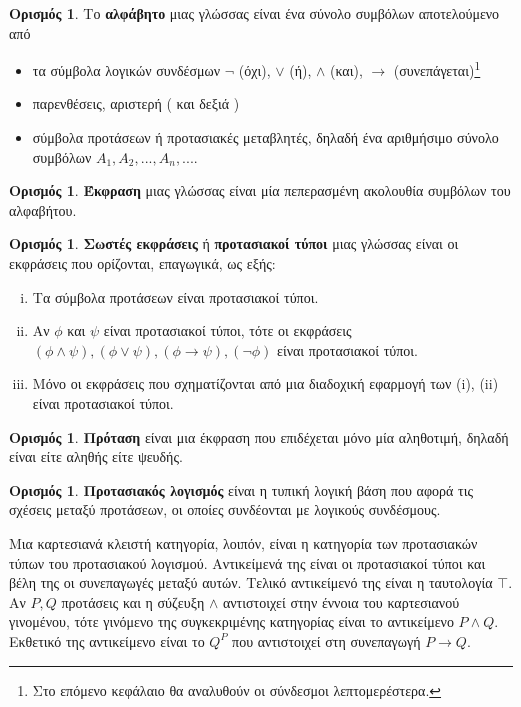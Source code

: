 \documentclass [a4paper,11pt] {book}
\theoremstyle{definition}
\theoremstyle{definition}
\newtheorem{definition}[theorem]{Ορισμός}
\begin{document}
\begin{definition}\label{alphabet}
Το \textbf{αλφάβητο} μιας γλώσσας είναι ένα σύνολο συμβόλων αποτελούμενο από
\begin{itemize}
\item τα σύμβολα λογικών συνδέσμων $ \neg$ (όχι), $\vee$ (ή), $\wedge$ (και), $\rightarrow$ (συνεπάγεται)\footnote{Στο επόμενο κεφάλαιο θα αναλυθούν οι σύνδεσμοι λεπτομερέστερα.}
\item παρενθέσεις, αριστερή ( και δεξιά )
\item σύμβολα προτάσεων ή προτασιακές μεταβλητές, δηλαδή ένα αριθμήσιμο σύνολο συμβόλων $A_{1},A_{2},...,A_{n},...$.
\end{itemize}
\end{definition}
\begin{definition}
\textbf{Έκφραση} μιας γλώσσας είναι μία πεπερασμένη ακολουθία συμβόλων του αλφαβήτου.
\end{definition}
\begin{definition}\label{well-formedFormulas}
\textbf{Σωστές εκφράσεις} ή \textbf{προτασιακοί τύποι} μιας γλώσσας είναι οι εκφράσεις που ορίζονται, επαγωγικά, ως εξής:
\begin{enumerate}[(i)]
\item Τα σύμβολα προτάσεων είναι προτασιακοί τύποι.
\item Αν $\phi$ και $\psi$ είναι προτασιακοί τύποι, τότε οι εκφράσεις $(\phi\wedge \psi), (\phi \vee \psi),(\phi \to \psi), (\neg \phi)$ είναι προτασιακοί τύποι.
\item Μόνο οι εκφράσεις που σχηματίζονται από μια διαδοχική εφαρμογή των (i), (ii) είναι προτασιακοί τύποι.
\end{enumerate}
\begin{definition}\label{proposition}
\textbf{Πρόταση} είναι μια έκφραση που επιδέχεται μόνο μία αληθοτιμή, δηλαδή είναι είτε αληθής είτε ψευδής.
\end{definition}
\begin{definition}\label{propositionalCalculus}
\textbf{Προτασιακός λογισμός} είναι η τυπική λογική βάση που αφορά τις σχέσεις μεταξύ προτάσεων, οι οποίες συνδέονται με λογικούς συνδέσμους.
\end{definition}
\end{definition}
Μια καρτεσιανά κλειστή κατηγορία, λοιπόν, είναι η κατηγορία των προτασιακών τύπων του προτασιακού λογισμού. Αντικείμενά της είναι οι προτασιακοί τύποι και βέλη της οι συνεπαγωγές μεταξύ αυτών. Τελικό αντικείμενό της είναι η ταυτολογία $\top$. Αν $P,Q$ προτάσεις και η σύζευξη $\wedge$ αντιστοιχεί στην έννοια του καρτεσιανού γινομένου, τότε γινόμενο της συγκεκριμένης κατηγορίας είναι το αντικείμενο $P\wedge Q$. Εκθετικό της αντικείμενο είναι το $Q^{P}$ που αντιστοιχεί στη συνεπαγωγή $P \to Q$.
\end{document}
